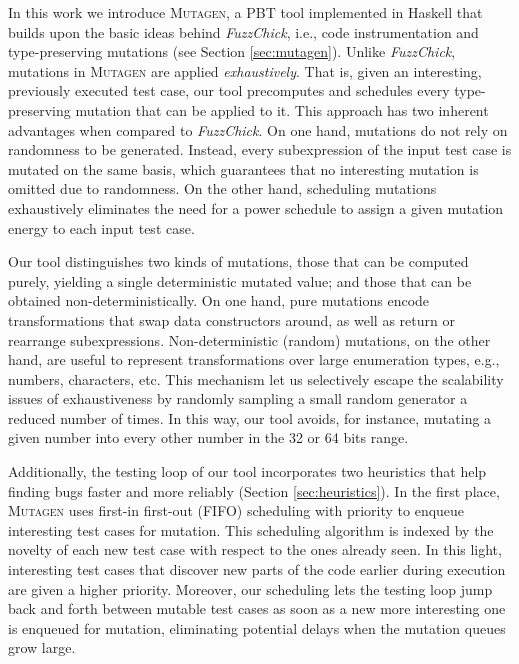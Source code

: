 \documentclass[acmsmall, anonymous]{acmart}
\newcommand{\fuzzchick}{\textit{FuzzChick}\xspace}
\newcommand{\mutagen}{\textsc{Mutagen}\xspace}
\begin{document}
In this work we introduce \mutagen, a PBT tool implemented in Haskell that
builds upon the basic ideas behind \fuzzchick, i.e., code instrumentation and
type-preserving mutations (see Section \ref{sec:mutagen}).
%
%
Unlike \fuzzchick, mutations in \mutagen are applied \emph{exhaustively}.
%
That is, given an interesting, previously executed test case, our tool
precomputes and schedules every type-preserving mutation that can be applied to
it.
%
This approach has two inherent advantages when compared to \fuzzchick.
%
On one hand, mutations do not rely on randomness to be generated.
%
Instead, every subexpression of the input test case is mutated on the same
basis, which guarantees that no interesting mutation is omitted due to
randomness.
%
%
On the other hand, scheduling mutations exhaustively eliminates the need for a
power schedule to assign a given mutation energy to each input test case.


%
Our tool distinguishes two kinds of mutations, those that can be computed
purely, yielding a single deterministic mutated value; and those that can be
obtained non-deterministically.
%
On one hand, pure mutations encode transformations that swap data constructors
around, as well as return or rearrange subexpressions.
%
Non-deterministic (random) mutations, on the other hand, are useful to represent
transformations over large enumeration types, e.g., numbers, characters, etc.
%
This mechanism let us selectively escape the scalability issues of
exhaustiveness by randomly sampling a small random generator a reduced number of
times.
%
In this way, our tool avoids, for instance, mutating a given number into every
other number in the 32 or 64 bits range.


Additionally, the testing loop of our tool incorporates two heuristics that help
finding bugs faster and more reliably (Section \ref{sec:heuristics}).
%
In the first place, \mutagen uses first-in first-out (FIFO) scheduling with
priority to enqueue interesting test cases for mutation.
%
This scheduling algorithm is indexed by the novelty of each new test case with
respect to the ones already seen.
%
In this light, interesting test cases that discover new parts of the code
earlier during execution are given a higher priority.
%
Moreover, our scheduling lets the testing loop jump back and forth between
mutable test cases as soon as a new more interesting one is enqueued for
mutation, eliminating potential delays when the mutation queues grow large.
\end{document}
